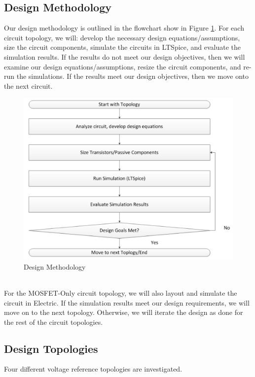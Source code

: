 \documentclass[conference]{IEEEtran}
\newcommand{\tab}{\hspace*{2em}}
\begin{document}
\subsection{Design Methodology}
Our design methodology is outlined in the flowchart show in Figure \ref{fig:design-methodology}.  For each circuit topology, we will: develop the necessary design equations/assumptions, size the circuit components, simulate the circuits in LTSpice, and evaluate the simulation results.  If the results do not meet our design objectives, then we will examine our design equations/assumptions, resize the circuit components, and re-run the simulations.  If the results meet our design objectives, then we move onto the next circuit.
\begin{figure}[!htbp]
  \centering
  \includegraphics[scale=0.45]{images/design-methodology.png}
  \caption[design-methodology]{Design Methodology}
  \label{fig:design-methodology}
\end{figure}
\\\tab
For the MOSFET-Only circuit topology, we will also layout and simulate the circuit in Electric.  If the simulation results meet our design requirements, we will move on to the next topology.  Otherwise, we will iterate the design as done for the rest of the circuit topologies.\\

\subsection{Design Topologies}
Four different voltage reference topologies are investigated.
\end{document}
